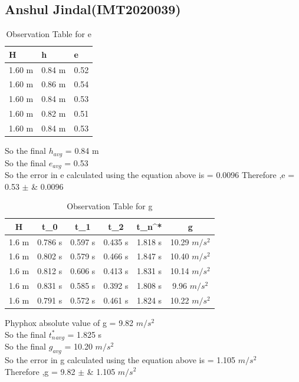 \documentclass[11pt]{scrartcl} %
\begin{document}
\subsection{Anshul Jindal(IMT2020039)}

\begin{table}[h] %
	\centering %
	\begin{tabular}{l l l}
		\toprule
		\textbf{H} & \textbf{h} & \textbf{e} \\
		\midrule
		1.60 m & 0.84 m & 0.52\\
        1.60 m & 0.86 m & 0.54\\
        1.60 m & 0.84 m & 0.53\\
        1.60 m & 0.82 m & 0.51 \\
        1.60 m & 0.84 m & 0.53 \\
		\bottomrule
	\end{tabular}
	\caption{Observation Table for e}
\end{table}
So the final $h_{avg}$ = 0.84 m\\
So the final $e_{avg}$ = 0.53\\
So the error in e calculated using the equation above is  = 0.0096 \newline
Therefore ,e = 0.53  $\pm$ &  0.0096 \\

\begin{table}[h]
\centering
\begin{tabular}{||c c c c c c||} 
\toprule
 \hline
 H & t_0 & t_1 & t_2 & t_n^* & g \\ [0.5ex] 
 \midrule
 \hline\hline
 1.6 m & 0.786 s & 0.597 s  & 0.435 s & 1.818 s & 10.29 $m/s^2$ \\
 \hline
 1.6 m & 0.802 s & 0.579 s & 0.466 s & 1.847 s & 10.40 $m/s^2$  \\
 \hline
 1.6 m & 0.812 s & 0.606 s & 0.413 s & 1.831 s  & 10.14 $m/s^2$ \\
 \hline
 1.6 m & 0.831 s & 0.585 s & 0.392 s & 1.808 s  & 9.96 $m/s^2$  \\
 \hline
 1.6 m & 0.791 s & 0.572 s & 0.461 s & 1.824 s  & 10.22 $m/s^2$ \\ [1ex]
 \bottomrule
 \hline
\end{tabular}
\caption{Observation Table for g}
\end{table}
Phyphox absolute value of g = 9.82 $m/s^2$\\
So the final $t_n^*_{avg}$ = 1.825 s\\
So the final $g_{avg}$ = 10.20 $m/s^2$\\
So the error in g calculated using the equation above is  = 1.105  $m/s^2$\\
Therefore ,g = 9.82  $\pm$ &  1.105 $m/s^2$ \\
\newpage
\end{document}
